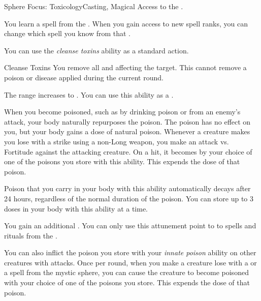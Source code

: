    \begin{feat}{Sphere Focus: Toxicology}{Casting, Magical}
        \featpre Access to the  .

         You learn a spell from the  .
        When you gain access to new spell ranks, you can change which spell you know from that .

         You can use the \textit{cleanse toxins} ability as a standard action.
        \begin{freeability}{Cleanse Toxins}
            \label{Cleanse Toxins}
            You remove all  and  affecting the target.
            This cannot remove a poison or disease applied during the current round.

            \rankline
             The range increases to \rngmed.
             You can use this ability as a .
        \end{freeability}

        When you become poisoned, such as by drinking poison or from an enemy's attack, your body naturally repurposes the poison.
        The poison has no effect on you, but your body gains a dose of natural poison.
        Whenever a creature makes you lose  with a  strike using a non-Long weapon, you make an attack vs. Fortitude against the attacking creature.
        On a hit, it becomes  by your choice of one of the poisons you store with this ability.
        This expends the dose of that poison.

        Poison that you carry in your body with this ability automatically decays after 24 hours, regardless of the normal duration of the poison.
        You can store up to 3 doses in your body with this ability at a time.

         You gain an additional .
        You can only use this attunement point to  to spells and rituals from the  .

        You can also inflict the poison you store with your \textit{innate poison} ability on other creatures with attacks.
        Once per round, when you make a creature lose  with a  or a spell from the  mystic sphere, you can cause the creature to become poisoned with your choice of one of the poisons you store.
        This expends the dose of that poison.


\end{feat}
